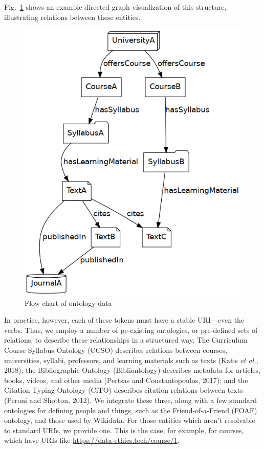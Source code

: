 \documentclass[
]{article}
\begin{document}
Fig.~\ref{fig:chart} shows an example directed graph visualization of
this structure, illustrating relations between these entities.

\begin{figure}
\hypertarget{fig:chart}{%
\centering
\includegraphics{chart.jpg}
\caption{Flow chart of ontology data}\label{fig:chart}
}
\end{figure}

In practice, however, each of these tokens must have a stable URI---even
the verbs. Thus, we employ a number of pe-existing ontologies, or
pre-defined sets of relations, to describe these relationships in a
structured way. The Curriculum Course Syllabus Ontology (CCSO) describes
relations between courses, universities, syllabi, professors, and
learning materials such as texts (Katis \emph{et al.}, 2018); the
Bibliographic Ontology (Bibliontology) describes metadata for articles,
books, videos, and other media (Pertsas and Constantopoulos, 2017); and
the Citation Typing Ontology (CiTO) describes citation relations between
texts (Peroni and Shotton, 2012). We integrate these three, along with a
few standard ontologies for defining people and things, such as the
Friend-of-a-Friend (FOAF) ontology, and those used by Wikidata. For
those entities which aren't resolvable to standard URIs, we provide one.
This is the case, for example, for courses, which have URIs like
\url{https://data-ethics.tech/course/1}.
\end{document}
